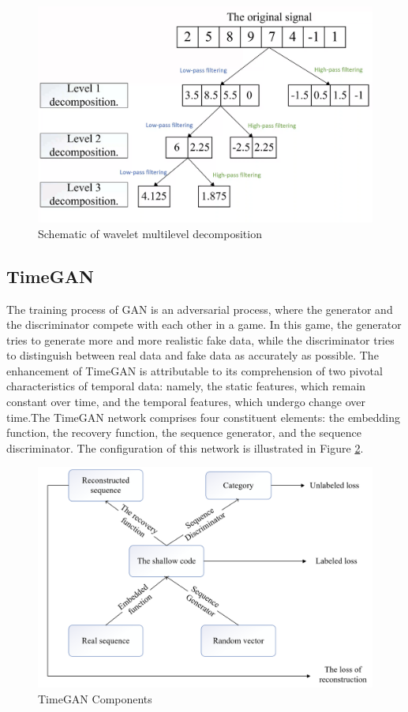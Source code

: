\documentclass[journal,article,submit,pdftex,moreauthors]{Definitions/mdpi}
\begin{document}
\begin{figure}[H]
    \centering
    \includegraphics[width=0.75\linewidth]{图片/小波变换.png}
    \caption{Schematic of wavelet multilevel decomposition}
    \label{fig:Wavelet Transform}
\end{figure}


\subsection{TimeGAN }

The training process of GAN is an adversarial process, where the generator and the discriminator compete with each other in a game. In this game, the generator tries to generate more and more realistic fake data, while the discriminator tries to distinguish between real data and fake data as accurately as possible. The enhancement of TimeGAN \cite{Yoon2019} is attributable to its comprehension of two pivotal characteristics of temporal data: namely, the static features, which remain constant over time, and the temporal features, which undergo change over time.The TimeGAN network comprises four constituent elements: the embedding function, the recovery function, the sequence generator, and the sequence discriminator. The configuration of this network is illustrated in Figure \ref{fig:timegan}.  


\begin{figure}[H]
    \centering
    \includegraphics[width=0.75\linewidth]{图片/timegan组成.png}
    \caption{TimeGAN Components}
    \label{fig:timegan}
\end{figure}
\end{document}
